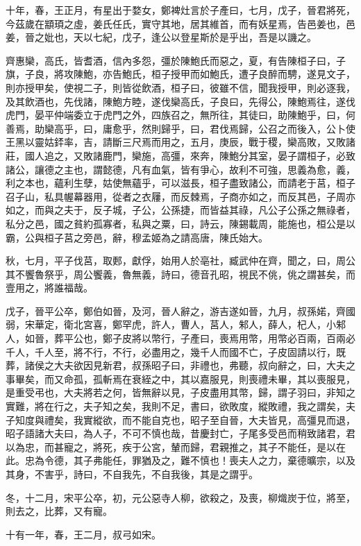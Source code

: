 \begin{pinyinscope}
十年，春，王正月，有星出于婺女，鄭裨灶言於子產曰，七月，戊子，晉君將死，今茲歲在顓頊之虛，姜氏任氏，實守其地，居其維首，而有妖星焉，告邑姜也，邑姜，晉之妣也，天以七紀，戊子，逢公以登星斯於是乎出，吾是以譏之。

齊惠欒，高氏，皆耆酒，信內多怨，彊於陳鮑氏而惡之，夏，有告陳桓子曰，子旗，子良，將攻陳鮑，亦告鮑氏，桓子授甲而如鮑氏，遭子良醉而騁，遂見文子，則亦授甲矣，使視二子，則皆從飲酒，桓子曰，彼雖不信，聞我授甲，則必逐我，及其飲酒也，先伐諸，陳鮑方睦，遂伐欒高氏，子良曰，先得公，陳鮑焉往，遂伐虎門，晏平仲端委立于虎門之外，四族召之，無所往，其徒曰，助陳鮑乎，曰，何善焉，助欒高乎，曰，庸愈乎，然則歸乎，曰，君伐焉歸，公召之而後入，公卜使王黑以靈姑銔率，吉，請斷三尺焉而用之，五月，庚辰，戰于稷，欒高敗，又敗諸莊，國人追之，又敗諸鹿門，欒施，高彊，來奔，陳鮑分其室，晏子謂桓子，必致諸公，讓德之主也，謂懿德，凡有血氣，皆有爭心，故利不可強，思義為愈，義，利之本也，蘊利生孽，姑使無蘊乎，可以滋長，桓子盡致諸公，而請老于莒，桓子召子山，私具幄幕器用，從者之衣屨，而反棘焉，子商亦如之，而反其邑，子周亦如之，而與之夫于，反子城，子公，公孫捷，而皆益其祿，凡公子公孫之無祿者，私分之邑，國之貧約孤寡者，私與之粟，曰，詩云，陳錫載周，能施也，桓公是以霸，公與桓子莒之旁邑，辭，穆孟姬為之請高唐，陳氏始大。

秋，七月，平子伐莒，取郠，獻俘，始用人於亳社，臧武仲在齊，聞之，曰，周公其不饗魯祭乎，周公饗義，魯無義，詩曰，德音孔昭，視民不佻，佻之謂甚矣，而壹用之，將誰福哉。

戊子，晉平公卒，鄭伯如晉，及河，晉人辭之，游吉遂如晉，九月，叔孫婼，齊國弱，宋華定，衛北宮喜，鄭罕虎，許人，曹人，莒人，邾人，薛人，杞人，小邾人，如晉，葬平公也，鄭子皮將以幣行，子產曰，喪焉用幣，用幣必百兩，百兩必千人，千人至，將不行，不行，必盡用之，幾千人而國不亡，子皮固請以行，既葬，諸侯之大夫欲因見新君，叔孫昭子曰，非禮也，弗聽，叔向辭之，曰，大夫之事畢矣，而又命孤，孤斬焉在衰絰之中，其以嘉服見，則喪禮未畢，其以喪服見，是重受弔也，大夫將若之何，皆無辭以見，子皮盡用其幣，歸，謂子羽曰，非知之實難，將在行之，夫子知之矣，我則不足，書曰，欲敗度，縱敗禮，我之謂矣，夫子知度與禮矣，我實縱欲，而不能自克也，昭子至自晉，大夫皆見，高彊見而退，昭子語諸大夫曰，為人子，不可不慎也哉，昔慶封亡，子尾多受邑而稍致諸君，君以為忠，而甚寵之，將死，疾于公宮，輦而歸，君親推之，其子不能任，是以在此。忠為令德，其子弗能任，罪猶及之，難不慎也！喪夫人之力，棄德曠宗，以及其身，不害乎，詩曰，不自我先，不自我後，其是之謂乎。

冬，十二月，宋平公卒，初，元公惡寺人柳，欲殺之，及喪，柳熾炭于位，將至，則去之，比葬，又有寵。

十有一年，春，王二月，叔弓如宋。


\end{pinyinscope}

